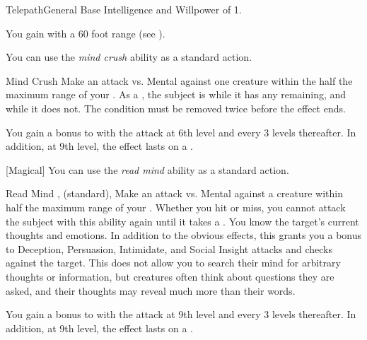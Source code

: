     \begin{feat}{Telepath}{General}
        \featpre Base Intelligence and Willpower of 1.

         You gain  with a 60 foot range (see ).

         You can use the \textit{mind crush} ability as a standard action.
        \begin{durationability}{Mind Crush}
            \rankline
            Make an attack vs. Mental against one creature within the half the maximum range of your .
            \hit As a , the subject is \dazed while it has any  remaining, and \stunned while it does not.
            \crit The condition must be removed twice before the effect ends.

            \rankline
            You gain a  bonus to  with the attack at 6th level and every 3 levels thereafter.
            In addition, at 9th level, the effect lasts  on a .
        \end{durationability}

        [Magical] You can use the \textit{read mind} ability as a standard action.
        \begin{durationability}{Read Mind}
            ,  (standard), 
            \rankline
            Make an attack vs. Mental against a creature within half the maximum range of your .
            Whether you hit or miss, you cannot attack the subject with this ability again until it takes a .
            \hit You know the target's current thoughts and emotions.
            In addition to the obvious effects, this grants you a  bonus to Deception, Persuasion, Intimidate, and Social Insight attacks and checks against the target.
            This does not allow you to search their mind for arbitrary thoughts or information, but creatures often think about questions they are asked, and their thoughts may reveal much more than their words.

            \rankline
            You gain a  bonus to  with the attack at 9th level and every 3 levels thereafter.
            In addition, at 9th level, the effect lasts  on a .
        \end{durationability}


\end{feat}
